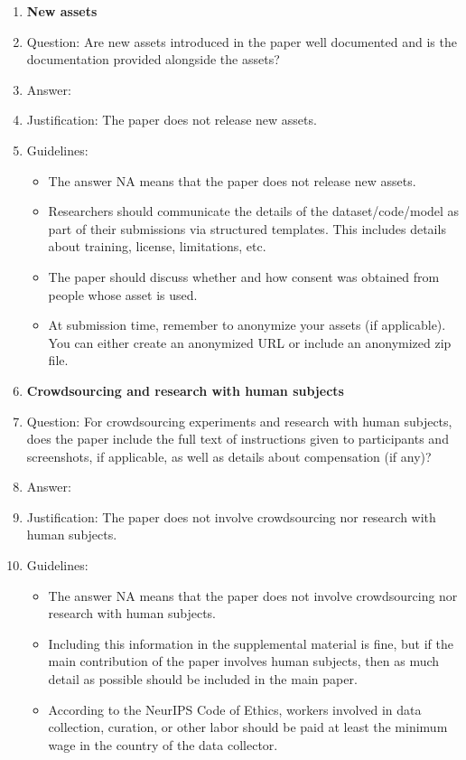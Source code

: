 \documentclass{article}
\begin{document}
{\begin{enumerate}
\item {\bf New assets}
    \item[] Question: Are new assets introduced in the paper well documented and is the documentation provided alongside the assets?
    \item[] Answer: \answerNA{} %
    \item[] Justification: The paper does not release new assets.
    \item[] Guidelines:
    \begin{itemize}
        \item The answer NA means that the paper does not release new assets.
        \item Researchers should communicate the details of the dataset/code/model as part of their submissions via structured templates. This includes details about training, license, limitations, etc. 
        \item The paper should discuss whether and how consent was obtained from people whose asset is used.
        \item At submission time, remember to anonymize your assets (if applicable). You can either create an anonymized URL or include an anonymized zip file.
    \end{itemize}

\item {\bf Crowdsourcing and research with human subjects}
    \item[] Question: For crowdsourcing experiments and research with human subjects, does the paper include the full text of instructions given to participants and screenshots, if applicable, as well as details about compensation (if any)? 
    \item[] Answer: \answerNA{} %
    \item[] Justification: The paper does not involve crowdsourcing nor research with human subjects.
    \item[] Guidelines:
    \begin{itemize}
        \item The answer NA means that the paper does not involve crowdsourcing nor research with human subjects.
        \item Including this information in the supplemental material is fine, but if the main contribution of the paper involves human subjects, then as much detail as possible should be included in the main paper. 
        \item According to the NeurIPS Code of Ethics, workers involved in data collection, curation, or other labor should be paid at least the minimum wage in the country of the data collector. 
    \end{itemize}


\end{enumerate}}
\end{document}
